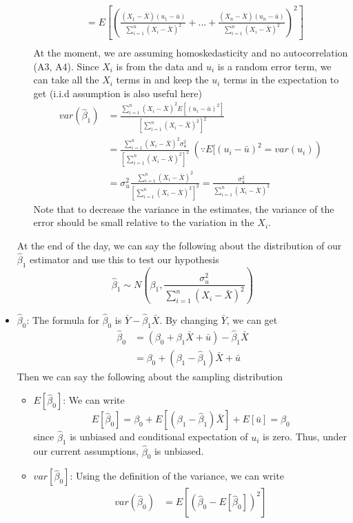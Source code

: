\documentclass[12pt]{article}
\theoremstyle{definition}
\theoremstyle{property}
\theoremstyle{assumption}
\theoremstyle{example}
\theoremstyle{comment}
\begin{document}
\begin{itemize}
\begin{itemize}
\[\begin{aligned}
&=E\left[\left(  \frac{(X_1-\bar{X})(u_1-\bar{u})}{\sum_{i=1}^n(X_i-\bar{X})^2}+...+\frac{(X_n-\bar{X})(u_n-\bar{u})}{\sum_{i=1}^n(X_i-\bar{X})^2} \right)^2\right]\\
\end{aligned}
\]
At the moment, we are assuming homoskedasticity and no autocorrelation (A3, A4). Since $X_i$ is from the data and $u_i$ is a random error term, we can take all the $X_i$ terms in and keep the $u_i$ terms in the expectation to get (i.i.d assumption is also useful here)
\[
\begin{aligned}
var(\hat{\beta}_1)&=\frac{\sum_{i=1}^n(X_i-\bar{X})^2E[(u_i-\bar{u})^2]}{[\sum_{i=1}^n(X_i-\bar{X})^2]^2}\\
&=\frac{\sum_{i=1}^n(X_i-\bar{X})^2\sigma_u^2}{[\sum_{i=1}^n(X_i-\bar{X})^2]^2} \ (\because E[(u_i-\bar{u})^2=var(u_i))\\
&=\sigma_u^2\frac{\sum_{i=1}^n(X_i-\bar{X})^2}{[\sum_{i=1}^n(X_i-\bar{X})^2]^2} =\frac{\sigma_u^2}{\sum_{i=1}^n(X_i-\bar{X})^2}
\end{aligned}
\]
Note that  to decrease the variance in the estimates, the variance of the error should be small relative to the variation in the $X_i$. 
\end{itemize}
At the end of the day, we can say the following about the distribution of our $\hat{\beta}_1$ estimator and use this to test our hypothesis
\[
\hat{\beta}_1 \sim N\left(\beta_1, \frac{\sigma_u^2}{\sum_{i=1}^n(X_i-\bar{X})^2}\right)
\]
\item $\hat{\beta}_0$: The formula for $\hat{\beta}_0$ is $\bar{Y}-\hat{\beta}_1\bar{X}$. By changing $\bar{Y}$, we can get
\[
\begin{aligned}
\hat{\beta}_0&=(\beta_0+\beta_1\bar{X}+\bar{u})-\hat{\beta}_1\bar{X}\\
&=\beta_0+(\beta_1-\hat{\beta}_1)\bar{X}+\bar{u}
\end{aligned}
\]
Then we can say the following about the sampling distribution
\begin{itemize}
\item $E[\hat{\beta}_0]$: We can write
\[
E[\hat{\beta}_0]=\beta_0+E[(\beta_1-\hat{\beta}_1)\bar{X}]+E[\bar{u}]=\beta_0
\]
since $\hat{\beta}_1$ is unbiased and conditional expectation of $u_i$ is zero. Thus, under our current assumptions, $\hat{\beta}_0$ is unbiased. 
\item $var[\hat{\beta}_0]$: Using the definition of the variance, we can write \[
\begin{aligned}
var(\hat{\beta}_0)&=E\left[\left(\hat{\beta}_0-E[\hat{\beta}_0]\right)^2\right] \\

\end{aligned}\]
\end{itemize}
\end{itemize}
\end{document}

